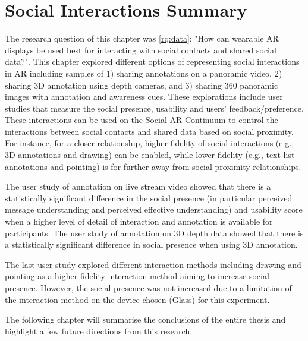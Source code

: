 \pagebreak
\section{Social Interactions Summary}

The research question of this chapter was \ref{rq:data}: "How can wearable AR displays be used best for interacting with social contacts and shared social data?". This chapter explored different options of representing social interactions in AR including samples of 1) sharing annotations on a panoramic video, 2) sharing 3D annotation using depth cameras, and 3) sharing 360 panoramic images with annotation and awareness cues. These explorations include user studies that measure the social presence, usability and users' feedback/preference. These interactions can be used on the Social AR Continuum to control the interactions between social contacts and shared data based on social proximity. For instance, for a closer relationship, higher fidelity of social interactions (e.g., 3D annotations and drawing) can be enabled, while lower fidelity (e.g., text list annotations and pointing) is for further away from social proximity relationships.

The user study of annotation on live stream video showed that there is a statistically significant difference in the social presence (in particular perceived message understanding and perceived effective understanding) and usability score when a higher level of detail of interaction and annotation is available for participants. The user study of annotation on 3D depth data showed that there is a statistically significant difference in social presence when using 3D annotation. 

The last user study explored different interaction methods including drawing and pointing as a higher fidelity interaction method aiming to increase social presence. However, the social presence was not increased due to a limitation of the interaction method on the device chosen (Glass) for this experiment.

The following chapter will summarise the conclusions of the entire thesis and highlight a few future directions from this research.

